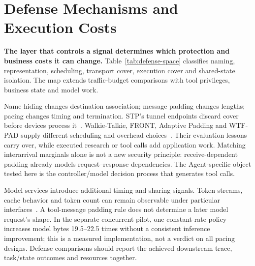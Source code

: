\section{Defense Mechanisms and Execution Costs}\label{sec:defenses}
\textbf{The layer that controls a signal determines which protection and business costs it can change.}
Table~\ref{tab:defense-space} classifies naming, representation, scheduling, transport cover, execution cover and shared-state isolation. The map extends traffic-budget comparisons with tool privileges, business state and model work.



Name hiding changes destination association; message padding changes lengths; pacing changes timing and termination. STP's tunnel endpoints discard cover before devices process it~\cite{apthorpe2019stp}. Walkie-Talkie, FRONT, Adaptive Padding and WTF-PAD supply different scheduling and overhead choices~\cite{wang2017walkietalkie,gong2020front,shmatikov2006adaptive,juarez2016wtfpad}. Their evaluation lessons carry over, while executed research or tool calls add application work. Matching interarrival marginals alone is not a new security principle: receive-dependent padding already models request--response dependencies. The Agent-specific object tested here is the controller/model decision process that generates tool calls.

Model services introduce additional timing and sharing signals. Token streams, cache behavior and token count can remain observable under particular interfaces~\cite{weiss2024prompt,whisperleak2025,earlybird2025,timewilltell2024,carlini2024timing,wu2026cacheprune}. A tool-message padding rule does not determine a later model request's shape. In the separate concurrent pilot, one constant-rate policy increases model bytes 19.5--22.5 times without a consistent inference improvement; this is a measured implementation, not a verdict on all pacing designs. Defense comparisons should report the achieved downstream trace, task/state outcomes and resources together.
